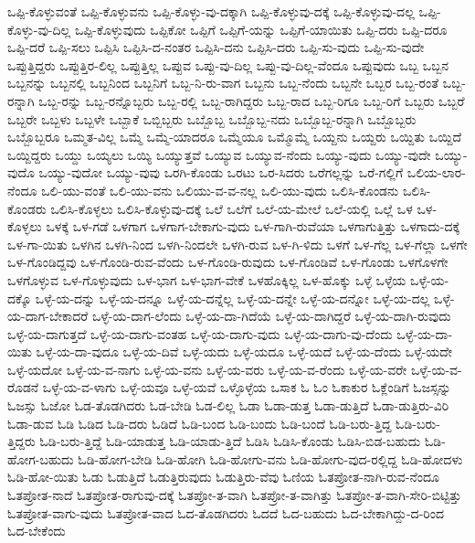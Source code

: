 {ಒಪ್ಪಿ-ಕೊಳ್ಳುವಂತೆ
ಒಪ್ಪಿ-ಕೊಳ್ಳುವನು
ಒಪ್ಪಿ-ಕೊಳ್ಳು-ವು-ದಕ್ಕಾಗಿ
ಒಪ್ಪಿ-ಕೊಳ್ಳುವು-ದಕ್ಕೆ
ಒಪ್ಪಿ-ಕೊಳ್ಳುವು-ದಲ್ಲ
ಒಪ್ಪಿ-ಕೊಳ್ಳು-ವು-ದಿಲ್ಲ
ಒಪ್ಪಿ-ಕೊಳ್ಳುವುದು
ಒಪ್ಪಿಕೋ
ಒಪ್ಪಿಗೆ
ಒಪ್ಪಿಗೆ-ಯನ್ನು
ಒಪ್ಪಿಗೆ-ಯಾಯಿತು
ಒಪ್ಪಿ-ದರು
ಒಪ್ಪಿ-ದರೂ
ಒಪ್ಪಿ-ದರೆ
ಒಪ್ಪಿ-ಸಲು
ಒಪ್ಪಿಸಿ
ಒಪ್ಪಿಸಿ-ದ-ನಂತರ
ಒಪ್ಪಿಸಿ-ದನು
ಒಪ್ಪಿಸಿ-ದರು
ಒಪ್ಪಿ-ಸು-ವುದು
ಒಪ್ಪಿ-ಸು-ವುದೇ
ಒಪ್ಪುತ್ತಿದ್ದರು
ಒಪ್ಪುತ್ತಿರ-ಲಿಲ್ಲ
ಒಪ್ಪುತ್ತಿಲ್ಲ
ಒಪ್ಪುವ
ಒಪ್ಪು-ವು-ದಿಲ್ಲ
ಒಪ್ಪು-ವು-ದಿಲ್ಲ-ವೆಂದೂ
ಒಪ್ಪುವುದು
ಒಬ್ಬ
ಒಬ್ಬನ
ಒಬ್ಬನನ್ನು
ಒಬ್ಬನಲ್ಲಿ
ಒಬ್ಬನಿಂದ
ಒಬ್ಬನಿಗೆ
ಒಬ್ಬ-ನಿ-ರು-ವಾಗ
ಒಬ್ಬನು
ಒಬ್ಬ-ನೆಂದು
ಒಬ್ಬನೇ
ಒಬ್ಬರ
ಒಬ್ಬ-ರಂತೆ
ಒಬ್ಬ-ರನ್ನಾಗಿ
ಒಬ್ಬ-ರನ್ನು
ಒಬ್ಬ-ರನ್ನೊಬ್ಬರು
ಒಬ್ಬ-ರಲ್ಲಿ
ಒಬ್ಬ-ರಾಗಿದ್ದರು
ಒಬ್ಬ-ರಾದ
ಒಬ್ಬ-ರಿಗೂ
ಒಬ್ಬ-ರಿಗೆ
ಒಬ್ಬರು
ಒಬ್ಬರೆ
ಒಬ್ಬರೇ
ಒಬ್ಬಳು
ಒಬ್ಬಳೇ
ಒಬ್ಬಾಕೆ
ಒಬ್ಬಿಬ್ಬರು
ಒಬ್ಬೊಬ್ಬ
ಒಬ್ಬೊಬ್ಬ-ನದು
ಒಬ್ಬೊಬ್ಬ-ರನ್ನಾಗಿ
ಒಬ್ಬೊಬ್ಬರು
ಒಬ್ಬೊಬ್ಬರೂ
ಒಮ್ಮತ-ವಿಲ್ಲ
ಒಮ್ಮೆ
ಒಮ್ಮೆ-ಯಾದರೂ
ಒಮ್ಮೆಯೂ
ಒಮ್ಮೊಮ್ಮೆ
ಒಯ್ದನು
ಒಯ್ದರು
ಒಯ್ದಿತು
ಒಯ್ದಿದೆ
ಒಯ್ದಿದ್ದರು
ಒಯ್ದು
ಒಯ್ಯಲು
ಒಯ್ಯಿ
ಒಯ್ಯುತ್ತವೆ
ಒಯ್ಯುವ
ಒಯ್ಯುವ-ನೆಂದು
ಒಯ್ಯು-ವುದು
ಒಯ್ಯು-ವುದೇ
ಒಯ್ಯು-ವುದೊ
ಒಯ್ಯು-ವುದೋ
ಒಯ್ಯು-ವುವು
ಒರಗಿ-ಕೊಂಡು
ಒರಟು
ಒರ-ಸಿದರು
ಒರೆಗಲ್ಲನ್ನು
ಒರೆ-ಗಲ್ಲಿಗೆ
ಒಲಿಯ-ಲಾರ-ನೆಂದೂ
ಒಲಿ-ಯು-ವಂತೆ
ಒಲಿ-ಯು-ವನು
ಒಲಿಯು-ವ-ವ-ನಲ್ಲ
ಒಲಿ-ಯು-ವುದು
ಒಲಿಸಿ-ಕೊಂಡನು
ಒಲಿಸಿ-ಕೊಂಡರು
ಒಲಿಸಿ-ಕೊಳ್ಳಲು
ಒಲಿಸಿ-ಕೊಳ್ಳುವು-ದಕ್ಕೆ
ಒಲೆ
ಒಲೆಗೆ
ಒಲೆ-ಯ-ಮೇಲೆ
ಒಲೆ-ಯಲ್ಲಿ
ಒಲ್ಲೆ
ಒಳ
ಒಳ-ಕೊಳ್ಳಲು
ಒಳಕ್ಕೆ
ಒಳ-ಗಡೆ
ಒಳಗಾಗ
ಒಳಗಾಗ-ಬೇಕಾಗು-ವುದು
ಒಳ-ಗಾಗಿ-ರುವೆಯಾ
ಒಳಗಾಗುತ್ತಿತ್ತು
ಒಳಗಾದು-ದಕ್ಕೆ
ಒಳ-ಗಾ-ಯಿತು
ಒಳಗಿನ
ಒಳಗಿ-ನಿಂದ
ಒಳಗಿ-ನಿಂದಲೇ
ಒಳಗಿ-ರುವ
ಒಳ-ಗಿ-ಳಿದು
ಒಳಗೆ
ಒಳ-ಗೆಲ್ಲ
ಒಳ-ಗೆಲ್ಲಾ
ಒಳಗೇ
ಒಳ-ಗೊಂಡಿದ್ದವು
ಒಳ-ಗೊಂಡಿ-ರುವ-ವೆಂದು
ಒಳ-ಗೊಂಡಿ-ರುವುದು
ಒಳ-ಗೊಂಡಿವೆ
ಒಳ-ಗೊಂಡು
ಒಳಗೊಳಗೇ
ಒಳಗೊಳ್ಳುವ
ಒಳ-ಗೊಳ್ಳುವುದು
ಒಳ-ಭಾಗ
ಒಳ-ಭಾಗ-ವೇಕೆ
ಒಳಹೊಕ್ಕಿಲ್ಲ
ಒಳ-ಹೊಕ್ಕು
ಒಳ್ಳೆ
ಒಳ್ಳೆಯ
ಒಳ್ಳೆ-ಯ-ದಕ್ಕೊ
ಒಳ್ಳೆ-ಯ-ದನ್ನು
ಒಳ್ಳೆ-ಯ-ದನ್ನೂ
ಒಳ್ಳೆ-ಯ-ದನ್ನೆಲ್ಲ
ಒಳ್ಳೆ-ಯ-ದನ್ನೇ
ಒಳ್ಳೆ-ಯ-ದನ್ನೋ
ಒಳ್ಳೆ-ಯ-ದಲ್ಲ
ಒಳ್ಳೆ-ಯ-ದಾಗ-ಬೇಕಾದರೆ
ಒಳ್ಳೆ-ಯ-ದಾಗ-ಲೆಂದು
ಒಳ್ಳೆ-ಯ-ದಾ-ಗಿದೆಯೆ
ಒಳ್ಳೆ-ಯ-ದಾಗಿದ್ದರೆ
ಒಳ್ಳೆ-ಯ-ದಾಗಿ-ರುವುದು
ಒಳ್ಳೆ-ಯ-ದಾಗುತ್ತದೆ
ಒಳ್ಳೆ-ಯ-ದಾಗು-ವಂತಹ
ಒಳ್ಳೆ-ಯ-ದಾಗು-ವುದು
ಒಳ್ಳೆ-ಯ-ದಾಗು-ವು-ದೆಂದು
ಒಳ್ಳೆ-ಯ-ದಾ-ಯಿತು
ಒಳ್ಳೆ-ಯ-ದಾ-ವುದೂ
ಒಳ್ಳೆ-ಯ-ದಿವೆ
ಒಳ್ಳೆ-ಯದು
ಒಳ್ಳೆ-ಯದೂ
ಒಳ್ಳೆ-ಯದೆ
ಒಳ್ಳೆ-ಯ-ದೆಂದು
ಒಳ್ಳೆ-ಯದೇ
ಒಳ್ಳೆ-ಯದೋ
ಒಳ್ಳೆ-ಯ-ವ-ನಾಗು
ಒಳ್ಳೆ-ಯ-ವನು
ಒಳ್ಳೆ-ಯ-ವರು
ಒಳ್ಳೆ-ಯ-ವ-ರೆಂದು
ಒಳ್ಳೆ-ಯ-ವರೇ
ಒಳ್ಳೆ-ಯ-ವ-ರೊಡನೆ
ಒಳ್ಳೆ-ಯ-ವ-ಳಾಗು
ಒಳ್ಳೆ-ಯವೂ
ಒಳ್ಳೆ-ಯವೆ
ಒಳ್ಳೊಳ್ಳೆಯ
ಒಸಾಕ
ಓ
ಓಂ
ಓಕಾಕುರ
ಓಕ್ಲೆಂಡಿಗೆ
ಓಜಸ್ಸನ್ನು
ಓಜಸ್ಸು
ಓಜೋ
ಓಡ-ತೊಡಗಿದರು
ಓಡ-ಬೇಡಿ
ಓಡ-ಲಿಲ್ಲ
ಓಡಾ
ಓಡಾ-ಡುತ್ತ
ಓಡಾ-ಡುತ್ತಿದೆ
ಓಡಾ-ಡುತ್ತಿರು-ವಿರಿ
ಓಡಾ-ಡುವ
ಓಡಿ
ಓಡಿದ
ಓಡಿ-ದರು
ಓಡಿದೆ
ಓಡಿ-ಬಂದ
ಓಡಿ-ಬಂದು
ಓಡಿ-ಬಂದೆ
ಓಡಿ-ಬರು-ತ್ತಿದ್ದ
ಓಡಿ-ಬರು-ತ್ತಿದ್ದರು
ಓಡಿ-ಬರು-ತ್ತಿದ್ದೆ
ಓಡಿ-ಯಾಡುತ್ತ
ಓಡಿ-ಯಾಡು-ತ್ತಿದೆ
ಓಡಿಸಿ
ಓಡಿಸಿ-ಕೊಂಡು
ಓಡಿಸಿ-ಬಿಡ-ಬಹುದು
ಓಡಿ-ಹೋಗ-ಬಹುದು
ಓಡಿ-ಹೋಗ-ಬೇಡಿ
ಓಡಿ-ಹೋಗಿ
ಓಡಿ-ಹೋಗು-ವನು
ಓಡಿ-ಹೋಗು-ವುದ-ರಲ್ಲಿದ್ದ
ಓಡಿ-ಹೋದಳು
ಓಡಿ-ಹೋ-ಯಿತು
ಓಡು
ಓಡುತ್ತಿದೆ
ಓಡುತ್ತಿರುವುದು
ಓಡುತ್ತಿರು-ವೆವು
ಓಣಿಯ
ಓತಪ್ರೋತ-ನಾಗಿ-ರುವ-ನೆಂದೂ
ಓತಪ್ರೋತ-ನಾದೆ
ಓತಪ್ರೋತ-ರಾಗುವು-ದಕ್ಕೆ
ಓತಪ್ರೋ-ತ-ವಾಗಿ
ಓತಪ್ರೋ-ತ-ವಾಗಿತ್ತು
ಓತಪ್ರೋ-ತ-ವಾಗಿ-ಸೇರಿ-ಬಿಟ್ಟಿತ್ತು
ಓತಪ್ರೋತ-ವಾಗು-ವುದು
ಓತಪ್ರೋತ-ವಾದ
ಓದ-ತೊಡಗಿದರು
ಓದದೆ
ಓದ-ಬಹುದು
ಓದ-ಬೇಕಾಗಿದ್ದು-ದ-ರಿಂದ
ಓದ-ಬೇಕೆಂದು
}
